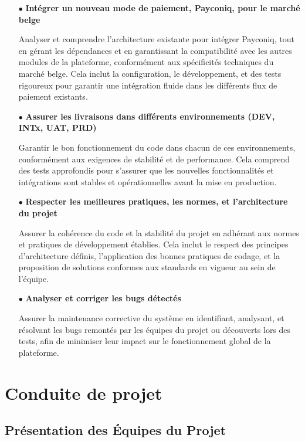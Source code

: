  \begin{itemize}
    \item[$\bullet$] \textbf{Intégrer un nouveau mode de paiement, Payconiq, pour le marché belge } 
    
    Analyser et comprendre l'architecture existante pour intégrer Payconiq, tout en gérant les dépendances et en garantissant la compatibilité avec les autres modules de la plateforme, conformément aux spécificités techniques du marché belge. Cela inclut la configuration, le développement, et des tests rigoureux pour garantir une intégration fluide dans les différents flux de paiement existants.

    \item[$\bullet$] \textbf{Assurer les livraisons dans différents environnements (DEV, INTx, UAT, PRD) } 
    
    Garantir le bon fonctionnement du code dans chacun de ces environnements, conformément aux exigences de stabilité et de performance. Cela comprend des tests approfondis pour s'assurer que les nouvelles fonctionnalités et intégrations sont stables et opérationnelles avant la mise en production.

    \item[$\bullet$] \textbf{Respecter les meilleures pratiques, les normes, et l'architecture du projet } 
    
    Assurer la cohérence du code et la stabilité du projet en adhérant aux normes et pratiques de développement établies. Cela inclut le respect des principes d'architecture définis, l'application des bonnes pratiques de codage, et la proposition de solutions conformes aux standards en vigueur au sein de l'équipe.

    \item[$\bullet$] \textbf{Analyser et corriger les bugs détectés }
    
    Assurer la maintenance corrective du système en identifiant, analysant, et résolvant les bugs remontés par les équipes du projet ou découverts lors des tests, afin de minimiser leur impact sur le fonctionnement global de la plateforme.

\end{itemize}

\section{Conduite de projet}

\subsection{Présentation des Équipes du Projet}

